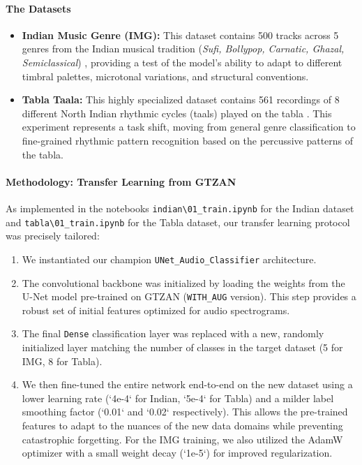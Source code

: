 \documentclass[11pt,a4paper]{article}
\begin{document}
\paragraph{The Datasets}
\begin{itemize}
    \item \textbf{Indian Music Genre (IMG):} This dataset contains 500 tracks across 5 genres from the Indian musical tradition (\textit{Sufi, Bollypop, Carnatic, Ghazal, Semiclassical}) \textbf{\cite{kaggleIndianMusic}}, %
    providing a test of the model's ability to adapt to different timbral palettes, microtonal variations, and structural conventions.
    \item \textbf{Tabla Taala:} This highly specialized dataset contains 561 recordings of 8 different North Indian rhythmic cycles (taals) played on the tabla \textbf{\cite{kaggleTablaTaala}}. %
    This experiment represents a task shift, moving from general genre classification to fine-grained rhythmic pattern recognition based on the percussive patterns of the tabla.
\end{itemize}

\paragraph{Methodology: Transfer Learning from GTZAN}
As implemented in the notebooks \texttt{indian\textbackslash01\_train.ipynb} for the Indian dataset and \texttt{tabla\textbackslash01\_train.ipynb} for the Tabla dataset, our transfer learning protocol was precisely tailored:
\begin{enumerate}
    \item We instantiated our champion \texttt{UNet\_Audio\_Classifier} architecture.
    \item The convolutional backbone was initialized by loading the weights from the U-Net model pre-trained on GTZAN (\texttt{WITH\_AUG} version). This step provides a robust set of initial features optimized for audio spectrograms.
    \item The final \texttt{Dense} classification layer was replaced with a new, randomly initialized layer matching the number of classes in the target dataset (5 for IMG, 8 for Tabla).
    \item We then fine-tuned the entire network end-to-end on the new dataset using a lower learning rate (`4e-4` for Indian, `5e-4` for Tabla) and a milder label smoothing factor (`0.01` and `0.02` respectively). This allows the pre-trained features to adapt to the nuances of the new data domains while preventing catastrophic forgetting. For the IMG training, we also utilized the AdamW optimizer with a small weight decay (`1e-5`) for improved regularization.
\end{enumerate}
\end{document}
